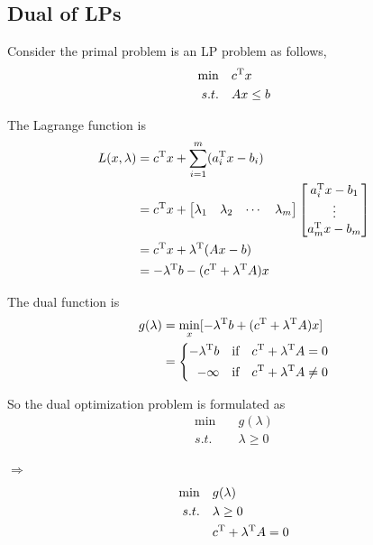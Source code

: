 




\vspace{0.5cm}
\subsection{Dual of LPs}
Consider the primal problem is an LP problem as follows,
\begin{align*}
\min\quad &c^{{\rm T}}x\\
s.t.\quad &Ax\leq b
\end{align*}

The Lagrange function is 
\begin{align*}
L(x,\lambda) &= c^{{\rm T}}x + \sum^m_{i=1}(a_i^{{\rm T}}x-b_i)\\
&= c^{{\rm T}}x+\begin{bmatrix}
\lambda_1&\lambda_2&\cdots&\lambda_m
\end{bmatrix}\begin{bmatrix}
a_i^{{\rm T}}x-b_1\\
\vdots\\
a_m^{{\rm T}}x-b_m
\end{bmatrix} \\
&=c^{{\rm T}}x+\lambda^{{\rm T}}(Ax-b)\\
&= -\lambda^{{\rm T}}b-(c^{{\rm T}}+\lambda^{{\rm T}}A)x
\end{align*}

The dual function is
\begin{align*}
g(\lambda) &= \min_x[-\lambda^{{\rm T}}b+(c^{{\rm T}}+\lambda^{{\rm T}}A)x]\\
&=
\label{eq6}
\left\{
\begin{aligned}
-\lambda^{{\rm T}}b &\quad \text{if} & c^{{\rm T}}+\lambda^{{\rm T}}A=0 \\
-\infty &\quad \text{if} & c^{{\rm T}}+\lambda^{{\rm T}}A\neq 0
\end{aligned}
\right.
\end{align*}

So the dual optimization problem is formulated as
\begin{align*}
\min\quad &g(\lambda)\\
s.t.\quad &\lambda \geq 0
\end{align*}

$\Rightarrow$
\begin{align*}
\min\quad &g(\lambda)\\
s.t.\quad &\lambda\geq 0\\
&c^{{\rm T}}+\lambda^{{\rm T}}A=0
\end{align*}

